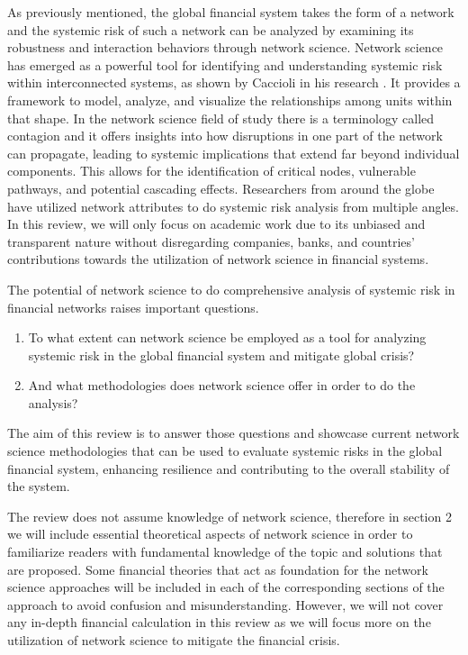 \documentclass[a4paper,11pt]{article}
\begin{document}
As previously mentioned, the global financial system takes the form of a network and the systemic risk of such a network can be analyzed by examining its robustness and interaction behaviors through network science. Network science has emerged as a powerful tool for identifying and understanding systemic risk within interconnected systems, as shown by Caccioli in his research \cite{Caccioli2018}. It provides a framework to model, analyze, and visualize the relationships among units within that shape. In the network science field of study there is a terminology called contagion and it offers insights into how disruptions in one part of the network can propagate, leading to systemic implications that extend far beyond individual components. This allows for the identification of critical nodes, vulnerable pathways, and potential cascading effects. Researchers from around the globe have utilized network attributes to do systemic risk analysis from multiple angles. In this review, we will only focus on academic work due to its unbiased and transparent nature without disregarding companies, banks, and countries' contributions towards the utilization of network science in financial systems.

The potential of network science to do comprehensive analysis of systemic risk in financial networks raises important questions. 
\begin{enumerate}
    \item To what extent can network science be employed as a tool for analyzing systemic risk in the global financial system and mitigate global crisis? 
    \item And what methodologies does network science offer in order to do the analysis? 
\end{enumerate}
The aim of this review is to answer those questions and showcase current network science methodologies that can be used to evaluate systemic risks in the global financial system, enhancing resilience and contributing to the overall stability of the system. 

The review does not assume knowledge of network science, therefore in section 2 we will include essential theoretical aspects of network science in order to familiarize readers with fundamental knowledge of the topic and solutions that are proposed. Some financial theories that act as foundation for the network science approaches will be included in each of the corresponding sections of the approach to avoid confusion and misunderstanding. However, we will not cover any in-depth financial calculation in this review as we will focus more on the utilization of network science to mitigate the financial crisis.
\end{document}
